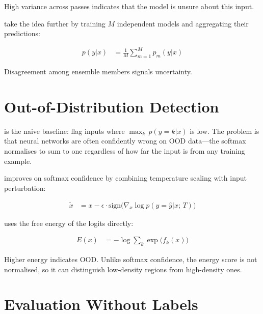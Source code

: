 High variance across passes indicates that the model is unsure about this input.

 take the idea further by training $M$ independent models and aggregating their predictions:

\begin{align*}
    p(y|x) &= \frac{1}{M} \sum_{m=1}^M p_m(y|x)
\end{align*}

Disagreement among ensemble members signals uncertainty.


\section{Out-of-Distribution Detection}


 is the naive baseline: flag inputs where $\max_k\, p(y{=}k|x)$ is low.
The problem is that neural networks are often confidently wrong on OOD data---the softmax normalises to sum to one regardless of how far the input is from any training example.

 improves on softmax confidence by combining temperature scaling with input perturbation:

\begin{align*}
    \tilde{x} &= x - \epsilon \cdot \text{sign}\!\bigl(\nabla_x \log p(y{=}\hat{y}|x;\, T)\bigr)
\end{align*}

 uses the free energy of the logits directly:

\begin{align*}
    E(x) &= -\log \sum_k \exp\!\bigl(f_k(x)\bigr)
\end{align*}

Higher energy indicates OOD.
Unlike softmax confidence, the energy score is not normalised, so it can distinguish low-density regions from high-density ones.


\section{Evaluation Without Labels}


